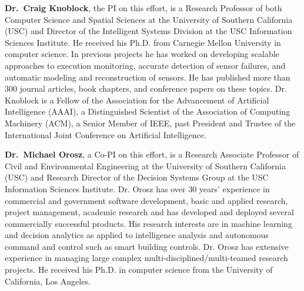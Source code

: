 \documentclass[12pt]{dod-blank}
\begin{document}
{\bf Dr.\ Craig Knoblock}, the PI on this effort, is a Research Professor of both Computer Science and Spatial Sciences at the University of Southern California (USC) and Director of the Intelligent Systems Division at the USC Information Sciences Institute.   He received his Ph.D. from Carnegie Mellon University in computer science. 
In previous projects he has worked on developing  scalable approaches to execution monitoring, accurate detection of sensor failures, and   automatic modeling and reconstruction of sensors.  He has published more than 300 journal articles, book chapters, and conference papers on these topics.  Dr. Knoblock is a Fellow of the Association for the Advancement of Artificial Intelligence (AAAI), a Distinguished Scientist of the Association of Computing Machinery (ACM), a Senior Member of IEEE, past President and Trustee of the International Joint Conference on Artificial Intelligence.

{\bf Dr.\ Michael Orosz}, a Co-PI on this effort, is a Research Associate Professor of Civil and Environmental Engineering at the University of Southern California (USC) and Research Director of the Decision Systems Group at the USC Information Sciences Institute.  Dr. Orosz has over 30 years’ experience in commercial and government software development, basic and applied research, project management, academic research and has developed and deployed several commercially successful products.  His research interests are in machine learning and decision analytics as applied to intelligence analysis and autonomous command and control such as smart building controls.    Dr. Orosz has extensive experience in managing large complex multi-disciplined/multi-teamed research projects. %
He received his Ph.D. in computer science from the University of California, Los Angeles.
\end{document}
